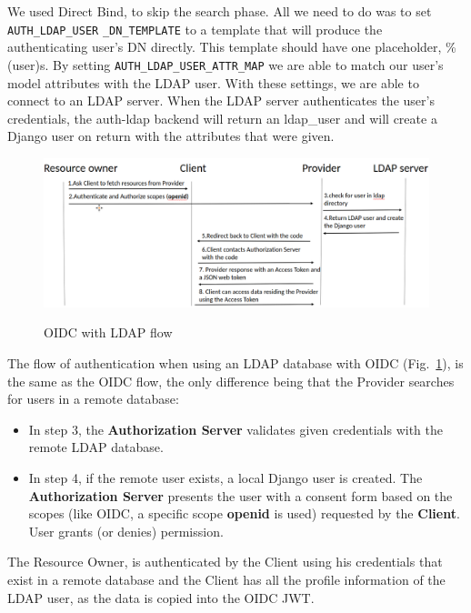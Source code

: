 We used Direct Bind, to skip the search phase. All we need to do was to set \verb|AUTH_LDAP_USER| \verb|_DN_TEMPLATE| to a template that will produce the authenticating user’s DN directly. This template should have one placeholder, \%(user)s. By setting \verb|AUTH_LDAP_USER_ATTR_MAP| we are able to match our user's model attributes with the LDAP user.
With these settings, we are able to connect to an LDAP server. When the LDAP server authenticates the user's credentials, the auth-ldap backend will return an ldap\_user and will create a Django user on return with the attributes that were given.

\begin{figure}[htb]
	\centering
	\includegraphics[scale=0.39]{figures/LDAP.png}\\
	\caption{OIDC with LDAP flow}\label{ldap-flow}
\end{figure}

The flow of authentication when using an LDAP database with OIDC (Fig.~\ref{ldap-flow}), is the same as the OIDC flow, the only difference being that the Provider searches for users in a remote database:

\begin{itemize}


	\item In step 3, the \textbf{Authorization Server} validates given credentials with the remote LDAP database.

	\item In step 4, if the remote user exists, a local Django user is created. The \textbf{Authorization Server} presents the user with a consent form based on the scopes (like OIDC, a specific scope \textbf{openid} is used) requested by the \textbf{Client}. User grants (or denies) permission.


\end{itemize}

The Resource Owner, is authenticated by the Client using his credentials that exist in a remote database and the Client has all the profile information of the LDAP user, as the data is copied into the OIDC JWT.
